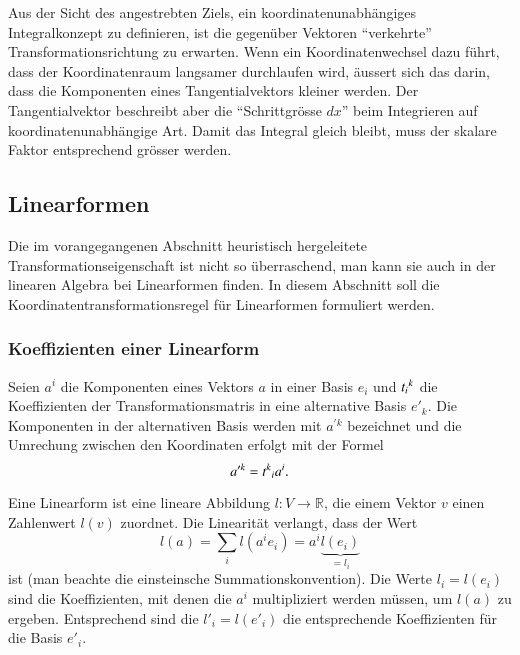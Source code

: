 Aus der Sicht des angestrebten Ziels, ein koordinatenunabhängiges
Integralkonzept zu definieren, ist die gegenüber Vektoren ``verkehrte''
Transformationsrichtung zu erwarten.
Wenn ein Koordinatenwechsel dazu führt, dass der Koordinatenraum
langsamer durchlaufen wird, äussert sich das darin, dass die Komponenten
eines Tangentialvektors kleiner werden.
Der Tangentialvektor beschreibt aber die ``Schrittgrösse $dx$'' beim
Integrieren auf koordinatenunabhängige Art.
Damit das Integral gleich bleibt, muss der skalare Faktor entsprechend
grösser werden.

%
%
\subsection{Linearformen
\label{buch:kurvenintegral:1formen:subsection:linearformen}}
Die im vorangegangenen Abschnitt heuristisch hergeleitete
Transformationseigenschaft ist nicht so überraschend, man kann sie
auch in der linearen Algebra bei Linearformen finden.
%
In diesem Abschnitt soll die Koordinatentransformationsregel für
Linearformen formuliert werden.

%
%
\subsubsection{Koeffizienten einer Linearform}
Seien $a^i$ die Komponenten eines Vektors $a$ in einer Basis $e_i$ und
$t_{i}\mathstrut ^k$ die Koeffizienten der Transformationsmatris
in eine alternative Basis $e'_k$.
Die Komponenten in der alternativen Basis werden mit $a^{\prime k}$
bezeichnet und die Umrechung zwischen den Koordinaten erfolgt mit der
Formel
\begin{equation}
a^{\prime k}
=
t^k\mathstrut_i a^i.
\label{buch:kurvenintegral:1formen:linearformen:vektor}
\end{equation}

Eine Linearform ist eine lineare Abbildung $l\colon V\to\mathbb{R}$,
die einem Vektor $v$ einen Zahlenwert $l(v)$ zuordnet.
Die Linearität verlangt, dass der Wert
\[
l(a)
=
\sum_i
l(a^ie_i)
=
a^i \underbrace{l(e_i)}_{\displaystyle=l_i}
\]
ist (man beachte die einsteinsche Summationskonvention).
Die Werte $l_i=l(e_i)$ sind die Koeffizienten, mit denen die $a^i$
multipliziert werden müssen, um $l(a)$ zu ergeben.
Entsprechend sind die $l'_i=l(e'_i)$ die entsprechende Koeffizienten
für die Basis $e'_i$.

%
%
